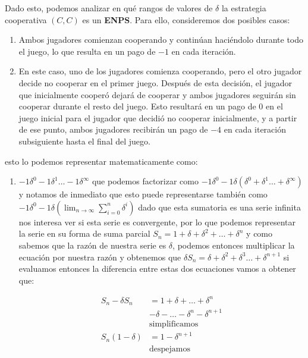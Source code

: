\documentclass[11pt]{article}
\begin{document}
\begin{flushleft}
    Dado esto, podemos analizar en qué rangos de valores de $\delta$ la estrategia cooperativa $(C, C)$ es un \textbf{ENPS}. Para ello, consideremos dos posibles casos:

    \begin{enumerate}[label=\textbf{Caso \arabic*.}]
        \item Ambos jugadores comienzan cooperando y continúan haciéndolo durante todo el juego, lo que resulta en un pago de $-1$ en cada iteración.
        \item En este caso, uno de los jugadores comienza cooperando, pero el otro jugador decide no cooperar en el primer juego. Después de esta decisión, el jugador que inicialmente cooperó dejará de cooperar y ambos jugadores seguirán sin cooperar durante el resto del juego. Esto resultará en un pago de $0$ en el juego inicial para el jugador que decidió no cooperar inicialmente, y a partir de ese punto, ambos jugadores recibirán un pago de $-4$ en cada iteración subsiguiente hasta el final del juego.
    \end{enumerate}
    esto lo podemos representar matematicamente como:
    \begin{enumerate}[label=\textbf{Caso \arabic*.}]
        \item $-1\delta^0-1\delta^1\dots-1\delta^\infty$ que podemos factorizar como $-1\delta^0-1\delta(\delta^0+\delta^1\dots+\delta^\infty)$ y notamos de inmediato que esto puede representarse también como $-1\delta^0-1\delta\left(\lim_{n\to\infty} \sum_{i=0}^n \delta^i\right)$ dado que esta sumatoria es una serie infinita nos interesa ver si esta serie es convergente, por lo que podemos representar la serie en su forma de suma parcial $S_n=1+\delta+\delta^2+\dots+\delta^n$ y como sabemos que la razón de nuestra serie es $\delta$, podemos entonces multiplicar la ecuación por nuestra razón y obtenemos que $\delta S_n = \delta+\delta^2+\delta^3\dots+\delta^{n+1}$ si evaluamos entonces la diferencia entre estas dos ecuaciones vamos a obtener que:
        \begin{minipage}{0.5\textwidth}
            \begin{align*}
            S_n-\delta S_n &= 1+\delta+\dots+\delta^n\\
            &-\delta-\dots-\delta^n-\delta^{n+1}\\
            &\text{simplificamos}\\
            S_n(1-\delta)&=1-\delta^{n+1}\\
            &\text{despejamos}\\

\end{align*}
\end{minipage}
\end{enumerate}
\end{flushleft}
\end{document}
